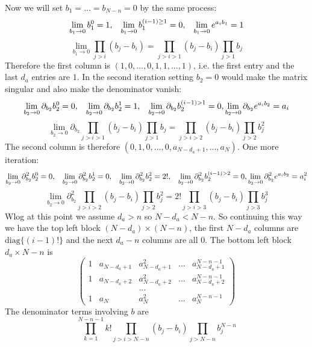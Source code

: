 \documentclass{article}
\begin{document}
Now we will set $b_{1} = ... = b_{N-n} = 0$ by the same process:
\[ \lim_{b_{1} \to 0} b_{1}^{0} = 1, \hspace{3mm} \lim_{b_{1} \to 0} b_{1}^{(i-1) \geq 1} = 0, \hspace{3mm} \lim_{b_{1} \to 0} e^{a_{i} b_{1}} = 1     \]
\[ \lim_{b_{1} \to 0} \prod_{j > i} (b_{j} - b_{i}) = \prod_{j > i > 1} (b_{j} - b_{i}) \prod_{j > 1} b_{j}     \]
Therefore the first column is $(1, 0, ..., 0, 1, 1, ..., 1)$, i.e. the first entry and the last $d_{a}$ entries are $1$. In the second iteration setting $b_{2} = 0$ would make the matrix singular and also make the denominator vanish:
\[ \lim_{b_{2} \to 0} \partial_{b_{2}} b_{2}^{0} = 0, \hspace{3mm} \lim_{b_{2} \to 0} \partial_{b_{2}} b_{2}^{1} = 1, \hspace{3mm} \lim_{b_{2} \to 0} \partial_{b_{2}} b_{2}^{(i-1) > 1} = 0, \lim_{b_{2} \to 0} \partial_{b_{2}} e^{a_{i} b_{2}} = a_{i}    \]
\[ \lim_{b_{2} \to 0} \partial_{b_{2}} \prod_{j > i > 1} (b_{j} - b_{i}) \prod_{j > 1} b_{j} = \prod_{j > i > 2} (b_{j} - b_{i}) \prod_{j > 2} b_{j}^{2}    \]
The second column is therefore $(0,1,0, ..., 0, a_{N-d_{a}+1}, ..., a_{N})$. One more iteration:
\[ \lim_{b_{3} \to 0} \partial_{b_{2}}^{2} b_{2}^{0} = 0, \hspace{3mm} \lim_{b_{2} \to 0} \partial_{b_{2}}^{2} b_{2}^{1} = 0, \hspace{3mm} \lim_{b_{2} \to 0} \partial_{b_{2}}^{2} b_{2}^{2} = 2!, 
\hspace{3mm} \lim_{b_{2} \to 0} \partial_{b_{2}}^{2} b_{2}^{(i-1) > 2} = 0, \lim_{b_{2} \to 0} \partial_{b_{2}}^{2} e^{a_{i} b_{2}} = a_{i}^{2}    \]
\[ \lim_{b_{2} \to 0} \partial_{b_{2}}^{2} \prod_{j > i > 2} (b_{j} - b_{i}) \prod_{j > 2} b_{j}^{2} = 2! \prod_{j > i > 3} (b_{j} - b_{i}) \prod_{j > 3} b_{j}^{3}     \]
Wlog at this point we assume $d_{a} > n$ so $N-d_{a} < N-n$. So continuing this way we have the top left block $(N-d_{a}) \times (N-n)$, the first $N-d_{a}$ columns are $\text{diag}\{(i-1)!\}$ and the next $d_{a} - n$ columns are all $0$. The bottom left block $d_{a} \times N-n$ is 
\[ \begin{pmatrix} 1 & a_{N-d_{a}+1} & a_{N-d_{a}+1}^{2} & ... & a_{N-d_{a}+1}^{N-n-1}
\\ 1 & a_{N-d_{a}+2} & a_{N-d_{a}+2}^{2} & ... & a_{N-d_{a}+2}^{N-n-1}
\\ & & ... & 
\\ 1 & a_{N} & a_{N}^{2} & ... & a_{N}^{N-n-1} 
\end{pmatrix}        \]
The denominator terms involving $b$ are 
\[ \prod_{k=1}^{N-n-1} k! \prod_{j > i > N-n} (b_{j} - b_{i}) \prod_{j > N-n} b_{j}^{N-n}     \]
\end{document}
